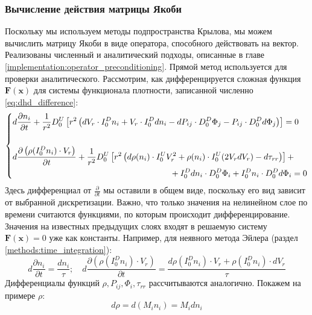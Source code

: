 \subsubsection*{Вычисление действия матрицы Якоби}
Поскольку мы используем {методы подпространства Крылова}, мы можем вычислить матрицу Якоби в виде оператора, способного действовать на вектор. Реализованы численный и аналитический подходы, описанные в главе \ref{implementation:operator_preconditioning}.
Прямой метод используется для проверки аналитического.
Рассмотрим, как дифференцируется сложная функция $\mathbf{F}(\mathbf{x})$ для системы функционала плотности, записанной численно \eqref{eq:dhd_difference}:
\begin{equation} 
    \left\{
        \begin{multlined}
            d\frac{\partial n_i}{\partial t} + \frac {1} {r^2} D^U_0 \left[ r^2 \left( dV_r \cdot I^D_0 n_i + V_r \cdot I^D_0 dn_i - dP_{ij} \cdot D^D_0 \Phi_j - P_{ij} \cdot D^D_0 d\Phi_j\right) \right] = 0 
            \\ \\
            \shoveleft{
                d\frac{\partial \left( \rho(I^D_0 n_i) \cdot V_r \right)}{\partial t} + \frac{1}{r^2} D^U_0 \left[ r^2 \left( d\rho(n_i) \cdot I^U_0 V^2_r + \rho(n_i) \cdot I^U_0 (2V_r dV_r) - d\tau_{rr} \right) \right] +
            }
            \\
            +  I^D_0 dn_i \cdot D^D_0 \Phi_i + I^D_0 n_i \cdot D^D_0 d\Phi_i = 0
        \end{multlined}
    \right.
\end{equation}
Здесь дифференциал от $\frac{\partial}{\partial t}$ мы оставили в общем виде, поскольку его вид зависит от выбранной дискретизации. Важно, что только значения на нелинейном слое по времени считаются функциями, по которым происходит дифференцирование. Значения на известных предыдущих слоях входят в решаемую систему $\mathbf{F}(\mathbf{x}) = 0$ уже как константы. Например, для неявного метода Эйлера (раздел \ref{methods:time_integration}):
\begin{equation}
     d\frac{\partial n_i}{\partial t} = \frac{dn_i}{\tau}; 
     \quad
     d\frac{\partial \left( \rho(I^D_0 n_i) \cdot V_r \right)}{\partial t} = \frac{d\rho(I^D_0 n_i) \cdot V_r + \rho(I^D_0 n_i) \cdot dV_r}{\tau}
\end{equation}
Дифференциалы функций $\rho, P_{ij}, \Phi_i, \tau_{rr}$ рассчитываются аналогично. Покажем на примере $\rho$:
\begin{equation}
d \rho = d\left( M_i n_i \right) = M_i dn_i
\end{equation}

